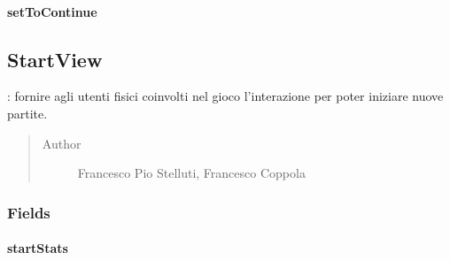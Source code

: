 \documentclass[letterpaper,10pt,italian]{sphinxmanual}
\begin{document}
\paragraph{setToContinue}
\label{\detokenize{source/it/unicam/cs/pa/mastermind/ui/StartStats:settocontinue}}

\begin{fulllineitems}
\label{\detokenize{source/it/unicam/cs/pa/mastermind/ui/StartStats:it.unicam.cs.pa.mastermind.ui.StartStats.setToContinue(boolean)}}
\end{fulllineitems}



\subsection{StartView}
\label{\detokenize{source/it/unicam/cs/pa/mastermind/ui/StartView:startview}}\label{\detokenize{source/it/unicam/cs/pa/mastermind/ui/StartView::doc}}

\begin{fulllineitems}
\label{\detokenize{source/it/unicam/cs/pa/mastermind/ui/StartView:it.unicam.cs.pa.mastermind.ui.StartView}}
: fornire agli utenti fisici coinvolti nel gioco l’interazione per poter iniziare nuove partite.
\begin{quote}\begin{description}
\item[{Author}] \leavevmode
Francesco Pio Stelluti, Francesco Coppola

\end{description}\end{quote}

\end{fulllineitems}



\subsubsection{Fields}
\label{\detokenize{source/it/unicam/cs/pa/mastermind/ui/StartView:fields}}

\paragraph{startStats}
\label{\detokenize{source/it/unicam/cs/pa/mastermind/ui/StartView:startstats}}
\end{document}
